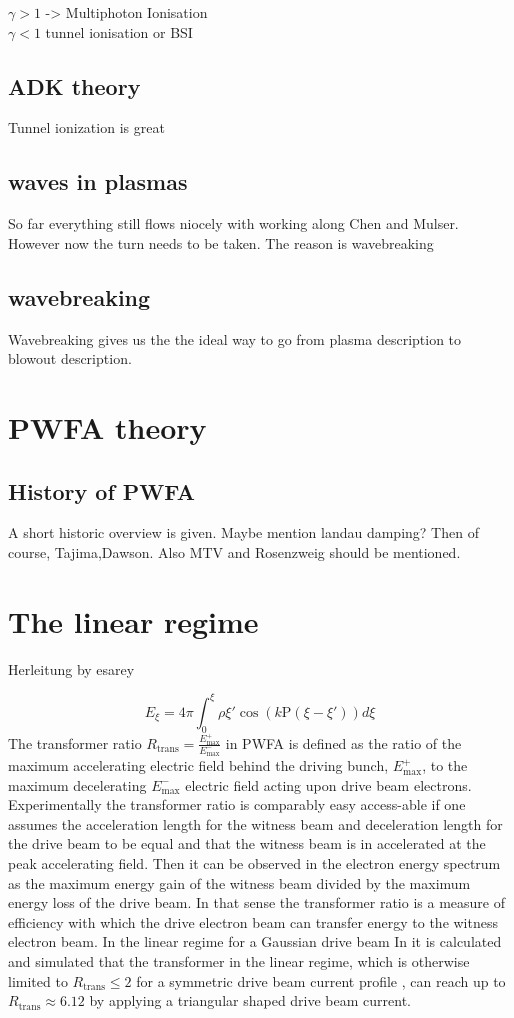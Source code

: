 $\gamma >1 $ -> Multiphoton Ionisation\\
$\gamma < 1$ tunnel ionisation or BSI

\subsection{ADK theory}
Tunnel ionization is great
	


\subsection{waves in plasmas}
So far everything still flows niocely with working along Chen and Mulser. However now the turn needs to be taken.
The reason is wavebreaking
\subsection{wavebreaking}
Wavebreaking gives us the the ideal way to go from plasma description to blowout description.
\section{PWFA theory}
\subsection{History of PWFA}
A short historic overview is given. 
Maybe mention landau damping? Then of course, Tajima,Dawson. Also MTV and Rosenzweig should be mentioned.
\section{The linear regime}
Herleitung by esarey \cite{RevModPhys.81.1229}


\begin{equation}
E_\xi=4\pi \int_0^\xi \rho{\xi'}\cos(k\mathrm{P}(\xi-\xi'))d\xi
\end{equation}
The transformer ratio $R_\mathrm{trans}=\frac{E_\mathrm{max}^+}{E_\mathrm{max}^-} $ in PWFA is defined as
the ratio of the maximum accelerating electric field
behind the driving bunch, $E_\mathrm{max}^+$, to the maximum decelerating $E_\mathrm{max}^-$
electric field acting upon drive beam electrons. Experimentally the transformer ratio is comparably easy access-able if one assumes the acceleration length for the witness beam and deceleration length for the drive beam to be equal and that the  witness beam is in accelerated at the peak accelerating field.
Then it can be observed in the electron energy spectrum as the maximum energy gain of the witness beam divided by the maximum energy loss of the drive beam. In that sense the transformer ratio is a measure of efficiency with which the drive electron beam can transfer energy to the witness electron beam. 
In the linear regime for a Gaussian drive beam 
In \cite{PhysRevLett.56.1252} it is calculated and simulated that the transformer in the linear regime, which is otherwise limited to $R_\mathrm{trans}\leq 2$ for a symmetric drive beam current profile \cite{bane1984wake}, can reach up to $R_\mathrm{trans}\approx 6.12$ by applying a triangular shaped drive beam current.
